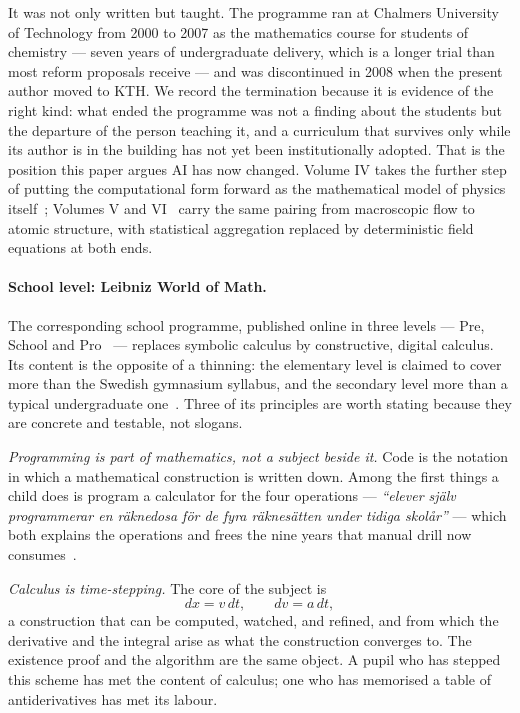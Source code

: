 \documentclass[11pt]{article}
\begin{document}
It was not only written but taught. The programme ran at Chalmers University of Technology from 2000
to 2007 as the mathematics course for students of chemistry --- seven years of undergraduate
delivery, which is a longer trial than most reform proposals receive --- and was discontinued in 2008
when the present author moved to KTH. We record the termination because it is evidence of the right
kind: what ended the programme was not a finding about the students but the departure of the person
teaching it, and a curriculum that survives only while its author is in the building has not yet
been institutionally adopted. That is the position this paper argues AI has now changed. Volume IV takes the further step of putting the computational
form forward as the mathematical model of physics itself~\cite{bsbook4}; Volumes V and
VI~\cite{bsbook5,bsbook6} carry the same pairing from macroscopic flow to atomic structure, with
statistical aggregation replaced by deterministic field equations at both ends.

\paragraph{School level: Leibniz World of Math.} The corresponding school programme, published
online in three levels --- Pre, School and Pro~\cite{leibnizworld} --- replaces symbolic calculus by
constructive, digital calculus. Its content is the opposite of a thinning: the elementary level is
claimed to cover more than the Swedish gymnasium syllabus, and the secondary level more than a
typical undergraduate one~\cite{leibnizvs}. Three of its principles are worth stating because they
are concrete and testable, not slogans.

\emph{Programming is part of mathematics, not a subject beside it.} Code is the notation in which a
mathematical construction is written down. Among the first things a child does is program a
calculator for the four operations --- \emph{``elever själv programmerar en räknedosa för de fyra
räknesätten under tidiga skolår''} --- which both explains the operations and frees the nine years
that manual drill now consumes~\cite{leibnizvs}.

\emph{Calculus is time-stepping.} The core of the subject is
\[
dx = v\,dt, \qquad dv = a\,dt,
\]
a construction that can be computed, watched, and refined, and from which the derivative and the
integral arise as what the construction converges to. The existence proof and the algorithm are the
same object. A pupil who has stepped this scheme has met the content of calculus; one who has
memorised a table of antiderivatives has met its labour.
\end{document}
